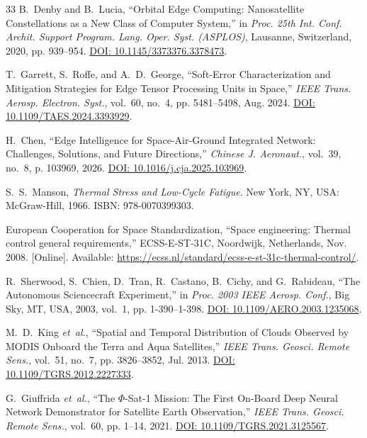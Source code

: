 \documentclass[journal]{IEEEtran}
\begin{document}
\begin{thebibliography}{33}
B.~Denby and B.~Lucia, ``Orbital Edge Computing: Nanosatellite Constellations as a New Class of Computer System,'' in \emph{Proc. 25th Int. Conf. Archit. Support Program. Lang. Oper. Syst. (ASPLOS)}, Lausanne, Switzerland, 2020, pp. 939--954. \href{https://doi.org/10.1145/3373376.3378473}{DOI: 10.1145/3373376.3378473}.

T.~Garrett, S.~Roffe, and A.~D.~George, ``Soft-Error Characterization and Mitigation Strategies for Edge Tensor Processing Units in Space,'' \emph{IEEE Trans. Aerosp. Electron. Syst.}, vol.~60, no.~4, pp. 5481--5498, Aug. 2024. \href{https://doi.org/10.1109/TAES.2024.3393929}{DOI: 10.1109/TAES.2024.3393929}.

H.~Chen, ``Edge Intelligence for Space-Air-Ground Integrated Network: Challenges, Solutions, and Future Directions,'' \emph{Chinese J. Aeronaut.}, vol.~39, no.~8, p. 103969, 2026. \href{https://doi.org/10.1016/j.cja.2025.103969}{DOI: 10.1016/j.cja.2025.103969}.

S.~S.~Manson, \emph{Thermal Stress and Low-Cycle Fatigue}. New York, NY, USA: McGraw-Hill, 1966. ISBN: 978-0070399303.

European Cooperation for Space Standardization, ``Space engineering: Thermal control general requirements,'' ECSS-E-ST-31C, Noordwijk, Netherlands, Nov. 2008. [Online]. Available: \url{https://ecss.nl/standard/ecss-e-st-31c-thermal-control/}.

R.~Sherwood, S.~Chien, D.~Tran, R.~Castano, B.~Cichy, and G.~Rabideau, ``The Autonomous Sciencecraft Experiment,'' in \emph{Proc. 2003 IEEE Aerosp. Conf.}, Big Sky, MT, USA, 2003, vol.~1, pp. 1-390--1-398. \href{https://doi.org/10.1109/AERO.2003.1235068}{DOI: 10.1109/AERO.2003.1235068}.

M.~D.~King \emph{et~al.}, ``Spatial and Temporal Distribution of Clouds Observed by MODIS Onboard the Terra and Aqua Satellites,'' \emph{IEEE Trans. Geosci. Remote Sens.}, vol.~51, no.~7, pp. 3826--3852, Jul. 2013. \href{https://doi.org/10.1109/TGRS.2012.2227333}{DOI: 10.1109/TGRS.2012.2227333}.

G.~Giuffrida \emph{et~al.}, ``The $\Phi$-Sat-1 Mission: The First On-Board Deep Neural Network Demonstrator for Satellite Earth Observation,'' \emph{IEEE Trans. Geosci. Remote Sens.}, vol.~60, pp. 1--14, 2021. \href{https://doi.org/10.1109/TGRS.2021.3125567}{DOI: 10.1109/TGRS.2021.3125567}.


\end{thebibliography}
\end{document}
